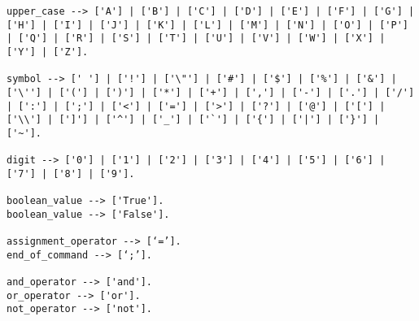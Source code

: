 \documentclass[12pt,letterpaper]{article}
\begin{document}
\begin{verbatim}
upper_case --> ['A'] | ['B'] | ['C'] | ['D'] | ['E'] | ['F'] | ['G'] | ['H'] | ['I'] | ['J'] | ['K'] | ['L'] | ['M'] | ['N'] | ['O'] | ['P'] | ['Q'] | ['R'] | ['S'] | ['T'] | ['U'] | ['V'] | ['W'] | ['X'] | ['Y'] | ['Z'].

symbol --> [' '] | ['!'] | ['\"'] | ['#'] | ['$'] | ['%'] | ['&'] | ['\''] | ['('] | [')'] | ['*'] | ['+'] | [','] | ['-'] | ['.'] | ['/'] | [':'] | [';'] | ['<'] | ['='] | ['>'] | ['?'] | ['@'] | ['['] | ['\\'] | [']'] | ['^'] | ['_'] | ['`'] | ['{'] | ['|'] | ['}'] | ['~'].

digit --> ['0'] | ['1'] | ['2'] | ['3'] | ['4'] | ['5'] | ['6'] | ['7'] | ['8'] | ['9'].

boolean_value --> ['True'].
boolean_value --> ['False'].

assignment_operator --> [‘=’].
end_of_command --> [‘;’].

and_operator --> ['and'].
or_operator --> ['or'].
not_operator --> ['not'].

\end{verbatim}
\end{document}
